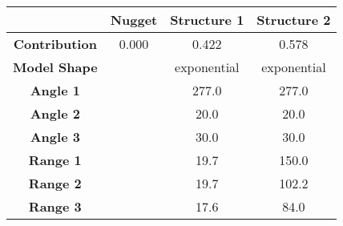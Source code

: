 \begin{tabular}{cccc}
\toprule
{} & Nugget &  Structure 1 &  Structure 2 \\
\midrule
\textbf{Contribution} &  0.000 &        0.422 &        0.578 \\
\textbf{Model Shape } &        &  exponential &  exponential \\
\textbf{Angle 1     } &        &        277.0 &        277.0 \\
\textbf{Angle 2     } &        &         20.0 &         20.0 \\
\textbf{Angle 3     } &        &         30.0 &         30.0 \\
\textbf{Range 1     } &        &         19.7 &        150.0 \\
\textbf{Range 2     } &        &         19.7 &        102.2 \\
\textbf{Range 3     } &        &         17.6 &         84.0 \\
\bottomrule
\end{tabular}
